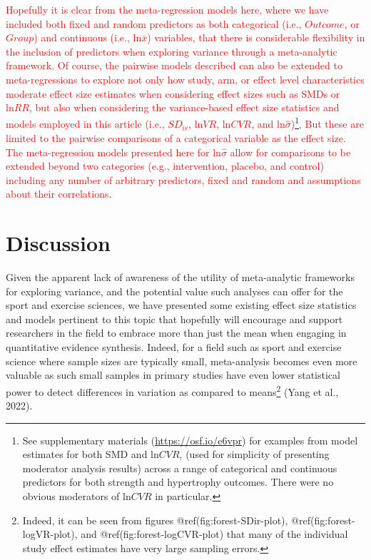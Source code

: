 \documentclass[
]{article}
\begin{document}
\textcolor{red}{Hopefully it is clear from the meta-regression models here, where we have included both fixed and random predictors as both categorical (i.e., $Outcome$, or $Group$) and continuous (i.e., $\textrm{ln}\overline{x}$) variables, that there is considerable flexibility in the inclusion of predictors when exploring variance through a meta-analytic framework. Of course, the pairwise models described can also be extended to meta-regressions to explore not only how study, arm, or effect level characteristics moderate effect size estimates when considering effect sizes such as SMDs or $\textrm{ln}RR$, but also when considering the variance-based effect size statistics and models employed in this article (i.e., $SD_{ir}$, $\textrm{ln}VR$, $\textrm{ln}CVR$, and $\textrm{ln}\hat\sigma$)}\footnote{See supplementary materials (\url{https://osf.io/e6vpr}) for examples from model estimates for both SMD and \(\textrm{ln}CVR\), (used for simplicity of presenting moderator analysis results) across a range of categorical and continuous predictors for both strength and hypertrophy outcomes. There were no obvious moderators of \(\textrm{ln}CVR\) in particular.}. \textcolor{red}{But these are limited to the pairwise comparisons of a categorical variable as the effect size. The meta-regression models presented here for $\textrm{ln}\hat\sigma$ allow for comparisons to be extended beyond two categories (e.g., intervention, placebo, and control) including any number of arbitrary predictors, fixed and random and assumptions about their correlations.}

\hypertarget{discussion}{%
\section{Discussion}\label{discussion}}

Given the apparent lack of awareness of the utility of meta-analytic frameworks for exploring variance, and the potential value such analyses can offer for the sport and exercise sciences, we have presented some existing effect size statistics and models pertinent to this topic that hopefully will encourage and support researchers in the field to embrace more than just the mean when engaging in quantitative evidence synthesis. Indeed, for a field such as sport and exercise science where sample sizes are typically small, meta-analysis becomes even more valuable as such small samples in primary studies have even lower statistical power to detect differences in variation as compared to means\footnote{Indeed, it can be seen from figures @ref(fig:forest-SDir-plot), @ref(fig:forest-logVR-plot), and @ref(fig:forest-logCVR-plot) that many of the individual study effect estimates have very large sampling errors.} (Yang et al., 2022).
\end{document}
